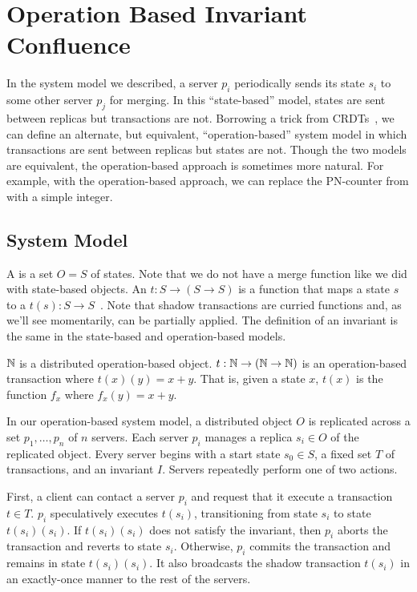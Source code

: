 \section{Operation Based Invariant Confluence}
In the system model we described, a server $p_i$ periodically sends its state
$s_i$ to some other server $p_j$ for merging. In this ``state-based'' model,
states are sent between replicas but transactions are not. Borrowing a trick
from CRDTs~\cite{shapiro2011conflict, shapiro2011comprehensive}, we can define
an alternate, but equivalent, ``operation-based'' system model in which
transactions are sent between replicas but states are not. Though the two
models are equivalent, the operation-based approach is sometimes more natural.
For example, with the operation-based approach, we can replace the PN-counter
from  with a simple integer.

\subsection{System Model}
A  is a set $O = S$ of states. Note
that we do not have a merge function like we did with state-based objects.
%
An  $t: S \to (S \to S)$ is a function
that maps a state $s$ to a  $t(s): S \to
S$~\cite{li2014automating}. Note that shadow transactions are curried functions
and, as we'll see momentarily, can be partially applied.
%
The definition of an invariant is the same in the state-based and
operation-based models.

\begin{example}
  $\mathbb{N}$ is a distributed operation-based object. $t: \mathbb{N} \to (\mathbb{N} \to
  \mathbb{N})$ is an operation-based transaction where $t(x)(y) = x + y$. That is,
  given a state $x$, $t(x)$ is the function $f_x$ where $f_x(y) = x + y$.
\end{example}

In our operation-based system model, a distributed object $O$ is replicated
across a set $p_1, \ldots, p_n$ of $n$ servers. Each server $p_i$ manages a
replica $s_i \in O$ of the replicated object. Every server begins with a start
state $s_0 \in S$, a fixed set $T$ of transactions, and an invariant $I$.
Servers repeatedly perform one of two actions.

First, a client can contact a server $p_i$ and request that it execute a
transaction $t \in T$. $p_i$ speculatively executes $t(s_i)$, transitioning
from state $s_i$ to state $t(s_i)(s_i)$. If $t(s_i)(s_i)$ does not satisfy the
invariant, then $p_i$ aborts the transaction and reverts to state $s_i$.
Otherwise, $p_i$ commits the transaction and remains in state $t(s_i)(s_i)$. It
also broadcasts the shadow transaction $t(s_i)$ in an exactly-once manner to
the rest of the servers.

